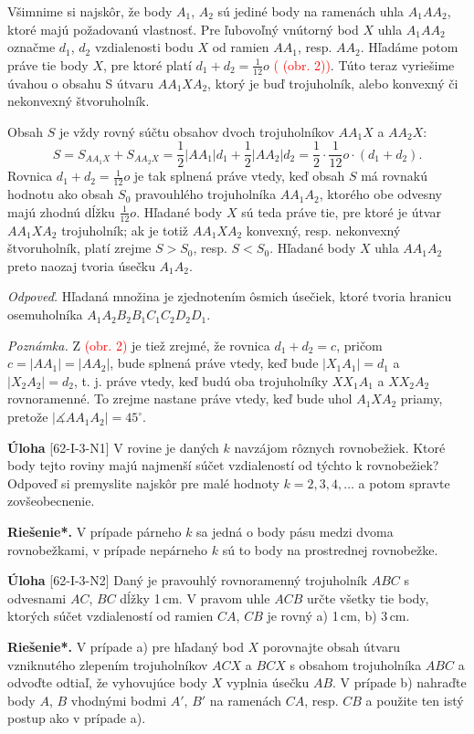 \documentclass{article}
\newcommand{\rieh}{\textbf{Riešenie*.} }
\newcommand{\ma}{\measuredangle}
\newcommand\todo[1]{\noindent\textcolor{red}{(#1)}}
\newcommand{\problem}[3]{
  \begin{tcolorbox}[breakable,notitle,boxrule=0pt,colback=light-gray,colframe=light-gray]
    \textbf{Úloha}
    [#1] #2
  \end{tcolorbox}
  \noindent#3
}
\begin{document}
{Všimnime si najskôr, že body $A_1$, $A_2$ sú jediné body na ramenách uhla $A_1 AA_2$, ktoré majú požadovanú vlastnosť. Pre ľubovoľný vnútorný bod $X$ uhla $A_1 AA_2$ označme $d_1$, $d_2$ vzdialenosti bodu $X$ od ramien $AA_1$, resp. $AA_2$. Hľadáme potom práve tie body $X$, pre ktoré platí $d_1 +d_2 =\frac{1}{12}o$ \todo{ (obr. 2)}. Túto  teraz vyriešime úvahou o obsahu S útvaru $AA_1 XA_2$, ktorý je buď trojuholník, alebo konvexný či nekonvexný štvoruholník.

Obsah $S$ je vždy rovný súčtu obsahov dvoch trojuholníkov $AA_1 X$ a $AA_2 X$:
$$S = S_{AA_1 X} + S_{AA_2 X} =\frac{1}{2}|AA_1 |d_1 + \frac{1}{2}|AA_2 |d_2 = \frac{1}{2} \cdot \frac{1}{12}o \cdot (d_1 + d_2 ).$$
Rovnica $d_1 +d_2 =\frac{1}{12}o$ je tak splnená práve vtedy, keď obsah $S$ má rovnakú hodnotu ako obsah $S_0$ pravouhlého trojuholníka $AA_1 A_2$, ktorého obe odvesny majú zhodnú dĺžku $\frac{1}{12}o$. Hľadané body $X$ sú teda práve tie, pre ktoré je útvar $AA_1 XA_2$ trojuholník; ak je totiž $AA_1 XA_2$ konvexný, resp. nekonvexný štvoruholník, platí zrejme $S > S_0$, resp. $S < S_0$. Hľadané body $X$ uhla $AA_1 A_2$ preto naozaj tvoria úsečku $A_1 A_2$.

\textit{Odpoveď.} Hľadaná množina je zjednotením ôsmich úsečiek, ktoré tvoria hranicu osemuholníka $A_1 A_2 B_2 B_1 C_1 C_2 D_2 D_1$.

\textit{Poznámka.} Z \todo{obr. 2} je tiež zrejmé, že rovnica $d_1 + d_2 = c$, pričom $c = |AA_1 | = |AA_2|$, bude splnená práve vtedy, keď bude $|X_1 A_1 | = d_1$ a $|X_2 A_2| = d_2$, t. j. práve vtedy, keď budú oba trojuholníky $XX_1 A_1$ a $XX_2 A_2$ rovnoramenné. To zrejme nastane práve vtedy, keď bude uhol $A_1 XA_2$ priamy, pretože $|\ma AA_1 A_2 | = 45^\circ$.
}


\problem{62-I-3-N1}{
V rovine je daných $k$ navzájom rôznych rovnobežiek. Ktoré body tejto roviny majú najmenší súčet vzdialeností od týchto k rovnobežiek? Odpoveď si premyslite najskôr pre malé hodnoty $k = 2, 3, 4, \ldots$ a potom spravte zovšeobecnenie.
}{
\rieh V prípade párneho $k$ sa jedná o body pásu medzi dvoma \uv{prostrednými} rovnobežkami, v prípade nepárneho $k$ sú to body na prostrednej rovnobežke.
}


\problem{62-I-3-N2}{
Daný je pravouhlý rovnoramenný trojuholník $ABC$ s odvesnami $AC$, $BC$ dĺžky 1\,cm. V pravom uhle $ACB$ určte všetky tie body, ktorých súčet vzdialeností od ramien $CA$, $CB$ je rovný a) 1\,cm, b) 3\,cm.
}{
\rieh V prípade a) pre hľadaný bod $X$ porovnajte obsah útvaru vzniknutého zlepením trojuholníkov $ACX$ a $BCX$ s obsahom trojuholníka $ABC$ a odvoďte odtiaľ, že vyhovujúce body $X$ vyplnia úsečku $AB$. V prípade b) nahraďte body $A$, $B$ vhodnými bodmi $A'$, $B'$ na ramenách $CA$, resp. $CB$ a použite ten istý postup ako v prípade a).
}
\end{document}

